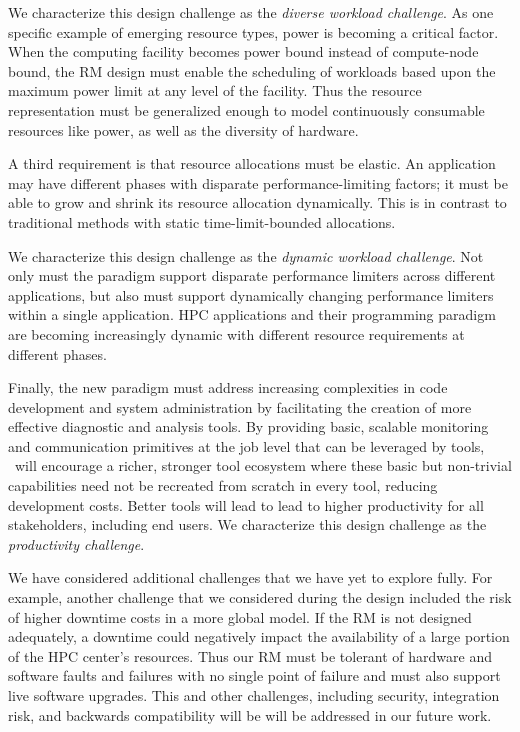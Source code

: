 We characterize this design challenge as the {\em diverse workload
challenge}.   As one specific example of emerging resource types,
power is becoming a critical factor. When the computing facility
becomes power bound instead of compute-node bound, the RM design
must enable the scheduling of workloads based upon the maximum
power limit at any level of the facility. Thus the resource
representation must be generalized enough to model continuously consumable
resources like power, as well as the diversity of hardware.

A third requirement is that resource allocations
must be elastic. An application may have different
phases with disparate performance-limiting factors;
it must be able to grow and shrink its resource allocation
dynamically.  This is in contrast to traditional methods with
static time-limit-bounded allocations.

We characterize this design challenge as the {\em dynamic workload
challenge}.  
Not only must the paradigm support disparate performance limiters
across different applications, but also must support dynamically
changing performance limiters within a single application.  HPC applications
and their programming paradigm are becoming increasingly dynamic with
different resource requirements at different phases.

Finally, the new paradigm must address increasing complexities
in code development and system administration by facilitating
the creation of more effective diagnostic and analysis tools.
By providing basic, scalable monitoring and communication
primitives at the job level that can be leveraged by tools,
\flux\ will encourage a richer, stronger tool ecosystem where
these basic but non-trivial capabilities need not be recreated
from scratch in every tool, reducing development costs.
Better tools will lead to lead to higher productivity for all
stakeholders, including end users.
We characterize this design challenge as the {\em productivity challenge}.

We have considered additional challenges that we
have yet to explore fully. For example,
another challenge that we considered during the design included
the risk of higher downtime costs in a more global model.
If the RM is not designed adequately, a downtime could negatively
impact the availability of a large portion of the HPC center’s
resources. Thus our RM must be tolerant of hardware and software
faults and failures with no single point of failure and must
also support live software upgrades. This and other challenges,
including security, integration risk, and backwards compatibility will be 
will be addressed in our future work.

%
